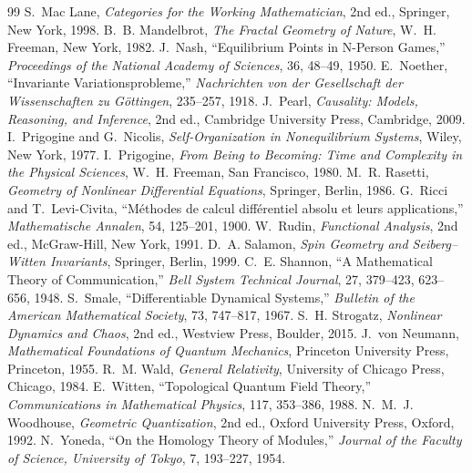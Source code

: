 \documentclass[11pt]{article}
\begin{document}
\begin{thebibliography}{99}
 S.~Mac Lane, \textit{Categories for the Working Mathematician}, 2nd ed., Springer, New York, 1998.
 B.~B. Mandelbrot, \textit{The Fractal Geometry of Nature}, W.~H. Freeman, New York, 1982.
 J.~Nash, ``Equilibrium Points in N-Person Games,'' \textit{Proceedings of the National Academy of Sciences}, 36, 48--49, 1950.
 E.~Noether, ``Invariante Variationsprobleme,'' \textit{Nachrichten von der Gesellschaft der Wissenschaften zu G\"ottingen}, 235--257, 1918.
 J.~Pearl, \textit{Causality: Models, Reasoning, and Inference}, 2nd ed., Cambridge University Press, Cambridge, 2009.
 I.~Prigogine and G.~Nicolis, \textit{Self-Organization in Nonequilibrium Systems}, Wiley, New York, 1977.
 I.~Prigogine, \textit{From Being to Becoming: Time and Complexity in the Physical Sciences}, W.~H. Freeman, San Francisco, 1980.
 M.~R. Rasetti, \textit{Geometry of Nonlinear Differential Equations}, Springer, Berlin, 1986.
 G.~Ricci and T.~Levi-Civita, ``M\'ethodes de calcul diff\'erentiel absolu et leurs applications,'' \textit{Mathematische Annalen}, 54, 125--201, 1900.
 W.~Rudin, \textit{Functional Analysis}, 2nd ed., McGraw-Hill, New York, 1991.
 D.~A. Salamon, \textit{Spin Geometry and Seiberg--Witten Invariants}, Springer, Berlin, 1999.
 C.~E. Shannon, ``A Mathematical Theory of Communication,'' \textit{Bell System Technical Journal}, 27, 379--423, 623--656, 1948.
 S.~Smale, ``Differentiable Dynamical Systems,'' \textit{Bulletin of the American Mathematical Society}, 73, 747--817, 1967.
 S.~H. Strogatz, \textit{Nonlinear Dynamics and Chaos}, 2nd ed., Westview Press, Boulder, 2015.
 J.~von Neumann, \textit{Mathematical Foundations of Quantum Mechanics}, Princeton University Press, Princeton, 1955.
 R.~M. Wald, \textit{General Relativity}, University of Chicago Press, Chicago, 1984.
 E.~Witten, ``Topological Quantum Field Theory,'' \textit{Communications in Mathematical Physics}, 117, 353--386, 1988.
 N.~M.~J. Woodhouse, \textit{Geometric Quantization}, 2nd ed., Oxford University Press, Oxford, 1992.
 N.~Yoneda, ``On the Homology Theory of Modules,'' \textit{Journal of the Faculty of Science, University of Tokyo}, 7, 193--227, 1954.

\end{thebibliography}
\end{document}
